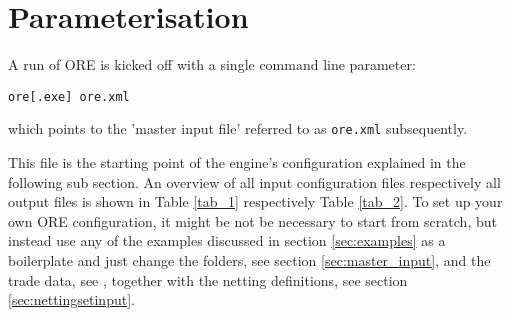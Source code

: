 \section{Parameterisation}\label{sec:configuration}

A run of ORE is kicked off with a single command line parameter: 

\medskip
\centerline{\tt ore[.exe] ore.xml}
\medskip

which points to the 'master input file' referred to  as {\tt ore.xml} subsequently. 

This file is the starting point of the engine's configuration explained in the following sub section.
An overview of all input configuration files respectively all output files is shown in Table \ref{tab_1} respectively Table \ref{tab_2}.
To set up your own ORE configuration, it might be not be necessary to start from scratch, but instead use any of the examples discussed
in section \ref{sec:examples} as a boilerplate and just change the folders, see section \ref{sec:master_input}, and the trade data,
see \cite{products}, together with the netting definitions, see section \ref{sec:nettingsetinput}.
